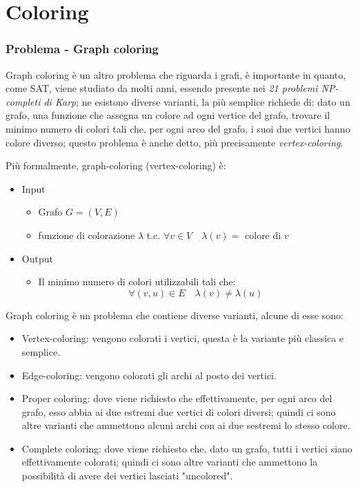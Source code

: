 \documentclass[12pt,a4paper]{article}
\begin{document}
\pagebreak
\part{Coloring}

\section{Problema - Graph coloring}
Graph coloring è un altro problema che riguarda i grafi, è importante in quanto, come SAT, viene studiato da molti anni, essendo presente nei \textit{21 problemi NP-completi di Karp}; ne esistono diverse varianti, la più semplice richiede di: dato un grafo, una funzione che assegna un colore ad ogni vertice del grafo, trovare il minimo numero di colori tali che, per ogni arco del grafo, i suoi due vertici hanno colore diverso; questo problema è anche detto, più precisamente \textit{vertex-coloring}.

Più formalmente, graph-coloring (vertex-coloring) è:
\begin{itemize}
\item Input
\begin{itemize}
\item Grafo $G = (V, E)$
\item funzione di colorazione $\lambda$ t.c. $\forall v \in V \quad \lambda(v) =$ colore di $v$ 
\end{itemize}

\item Output
\begin{itemize}
\item Il minimo numero di colori utilizzabili tali che: $$\forall (v, u) \in E \quad \lambda(v) \neq \lambda(u)$$
\end{itemize}
\end{itemize}

Graph coloring è un problema che contiene diverse varianti, alcune di esse sono:
\begin{itemize}
\item Vertex-coloring: vengono colorati i vertici, questa è la variante più classica e semplice.
\item Edge-coloring: vengono colorati gli archi al posto dei vertici.
\item Proper coloring: dove viene richiesto che effettivamente, per ogni arco del grafo, esso abbia ai due estremi due vertici di colori diversi; quindi ci sono altre varianti che ammettono alcuni archi con ai due sestremi lo stesso colore.
\item Complete coloring: dove viene richiesto che, dato un grafo, tutti i vertici siano effettivamente colorati; quindi ci sono altre varianti che ammettono la possibilità di avere dei vertici lasciati "uncolored".
\end{itemize}
\end{document}
